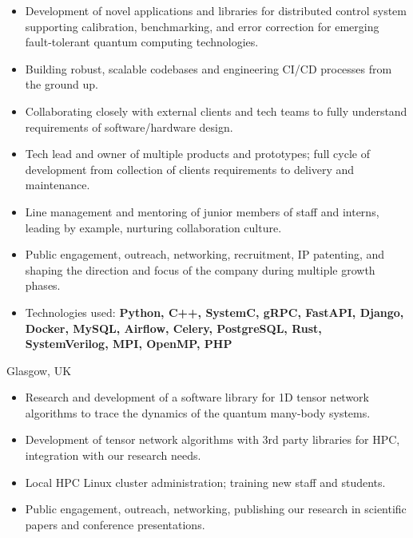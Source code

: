 \documentclass[10pt,a4paper,ragged2e,withhyper]{altacv}
\begin{document}
\begin{paracol}{2}
\begin{itemize}
    \item Development of novel applications and libraries for
    distributed control system supporting calibration, benchmarking,
    and error correction for emerging fault-tolerant quantum computing
    technologies.

    \item Building robust, scalable codebases and engineering CI/CD processes
    from the ground up.

    \item Collaborating closely with external clients and tech teams to fully
    understand requirements of software/hardware design.

    \item Tech lead and owner of multiple products and prototypes;
    full cycle of development from collection of clients requirements to
    delivery and maintenance.

    \item Line management and mentoring of junior members of staff and interns,
    leading by example, nurturing collaboration culture.

    \item Public engagement, outreach, networking, recruitment, IP patenting,
    and shaping the direction and focus of the company during multiple growth
    phases.

    \item Technologies used:
    {\bf Python, C++, SystemC, gRPC, FastAPI, Django, Docker, MySQL, Airflow,
    Celery, PostgreSQL, Rust, SystemVerilog, MPI, OpenMP, PHP}
\end{itemize}

\divider

{Glasgow, UK}

\begin{itemize}
    \item Research and development of a software library for 1D tensor network
    algorithms to trace the dynamics of the quantum many-body systems.

    \item Development of tensor network algorithms with 3rd party libraries
    for HPC, integration with our research needs.

    \item Local HPC Linux cluster administration;
    training new staff and students.

    \item Public engagement, outreach, networking, publishing our research
    in scientific papers and conference presentations.
    

\end{itemize}
\end{paracol}
\end{document}
